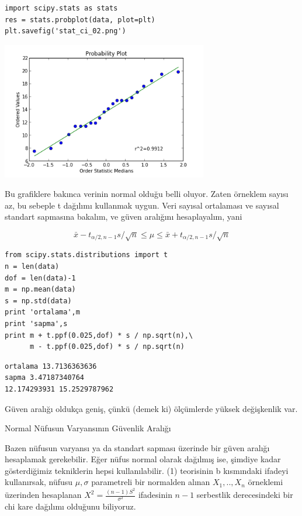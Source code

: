 \documentclass[12pt,fleqn]{article}\usepackage{../../common}
\begin{document}
\begin{verbatim}
import scipy.stats as stats
res = stats.probplot(data, plot=plt)
plt.savefig('stat_ci_02.png')
\end{verbatim}

\includegraphics[height=6cm]{stat_ci_02.png}

Bu grafiklere bakınca verinin normal olduğu belli oluyor. Zaten örneklem
sayısı az, bu sebeple t dağılımı kullanmak uygun. Veri sayısal ortalaması
ve sayısal standart sapmasına bakalım, ve güven aralığını hesaplayalım, 
yani

$$ \bar{x} - t_{\alpha/2,n-1}s/\sqrt{n} \le
\mu \le
 \bar{x} + t_{\alpha/2,n-1}s/\sqrt{n}
$$

\begin{verbatim}
from scipy.stats.distributions import t
n = len(data)
dof = len(data)-1
m = np.mean(data)
s = np.std(data)
print 'ortalama',m
print 'sapma',s
print m + t.ppf(0.025,dof) * s / np.sqrt(n),\
      m - t.ppf(0.025,dof) * s / np.sqrt(n)
\end{verbatim}

\begin{verbatim}
ortalama 13.7136363636
sapma 3.47187340764
12.174293931 15.2529787962
\end{verbatim}

Güven aralığı oldukça geniş, çünkü (demek ki) ölçümlerde yüksek değişkenlik
var. 

Normal Nüfusun Varyansının Güvenlik Aralığı

Bazen nüfusun varyansı ya da standart sapması üzerinde bir güven aralığı
hesaplamak gerekebilir. Eğer nüfus normal olarak dağılmış ise, şimdiye
kadar gösterdiğimiz tekniklerin hepsi kullanılabilir. (1) teorisinin b
kısmındaki ifadeyi kullanırsak, nüfusu $\mu,\sigma$ parametreli bir
normalden alınan $X_1,..,X_n$ örneklemi üzerinden hesaplanan
$X^2 = \frac{(n-1)S^2}{\sigma^2}$ ifadesinin $n-1$ serbestlik derecesindeki bir
chi kare dağılımı olduğunu biliyoruz.
\end{document}
